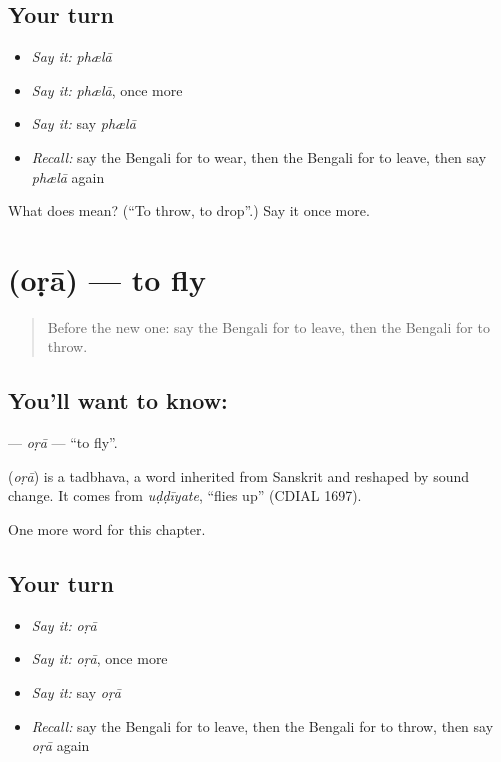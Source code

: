 \subsection*{Your turn}
\begin{itemize}
\raggedright
  \item \emph{Say it:} \emph{phælā}
  \item \emph{Say it:} \emph{phælā}, once more
  \item \emph{Say it:} say \emph{phælā}
  \item \emph{Recall:} say the Bengali for to wear, then the Bengali for to leave, then say \emph{phælā} again
\end{itemize}

\begin{tcolorbox}[breakable,colback=teal!4,colframe=teal!35!black,title={Before you move on}]
What does  mean? (\textquotedblleft{}To throw, to drop\textquotedblright{}.) Say it once more.
\end{tcolorbox}
\section[\texorpdfstring{\bn{ওড়া} (oṛā)}{ওড়া (oṛā)}]{ (oṛā) — to fly}

\label{lesson:BN-C53-ora}



\begin{quote}
Before the new one: say the Bengali for to leave, then the Bengali for to throw.
\end{quote}

\subsection*{You'll want to know: }
\textbf{} — \emph{oṛā} — \textquotedblleft{}to fly\textquotedblright{}.

\begin{cousinweb}
\textbf{} (\emph{oṛā}) is a tadbhava, a word inherited from Sanskrit and reshaped by sound change. It comes from \emph{uḍḍīyate}, \textquotedblleft{}flies up\textquotedblright{} (CDIAL 1697).
\end{cousinweb}

\begin{grammarlens}[title={What you've built}]
One more word for this chapter.
\end{grammarlens}

\subsection*{Your turn}
\begin{itemize}
\raggedright
  \item \emph{Say it:} \emph{oṛā}
  \item \emph{Say it:} \emph{oṛā}, once more
  \item \emph{Say it:} say \emph{oṛā}
  \item \emph{Recall:} say the Bengali for to leave, then the Bengali for to throw, then say \emph{oṛā} again
\end{itemize}

